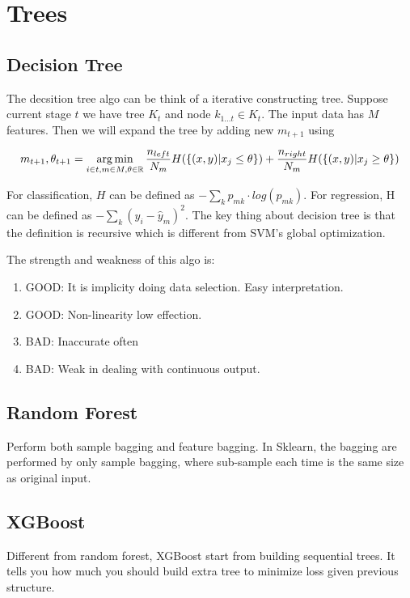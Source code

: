 \section{Trees}
\subsection{Decision Tree}

The decsition tree algo can be think of a iterative constructing tree. Suppose current stage $t$ we have tree $K_t$ and node $k_{1 ... t} \in K_t$. The input data has $M$ features.
Then we will expand the tree by adding new $m_{t+1}$ using

\begin{equation}
  \begin{aligned}
    m_{t+1}, \theta_{t+1} = \operatorname*{arg\,min}_{i \in t, m \in M, \theta \in \mathbb{R}} \frac{n_{left}}{N_m} H(\{(x, y)| x_j \leq \theta\}) + \frac{n_{right}}{N_m} H(\{(x, y)| x_j \geq \theta\})
  \end{aligned}
\end{equation}

For classification, $H$ can be defined as $ -\sum_k p_{mk} \cdot log(p_{mk}) $. For regression, H can be defined as $ -\sum_k (y_i - \hat{y}_m)^2$. The key thing about decision tree is that the {\color{blue}definition is recursive which is different from SVM's global optimization.}

The strength and weakness of this algo is:

\begin{enumerate}
  \item {\color{green}GOOD}: It is implicity doing data selection. Easy interpretation.
  \item {\color{green}GOOD}: Non-linearity low effection.
  \item {\color{red}BAD}: Inaccurate often
  \item {\color{red}BAD}: Weak in dealing with continuous output.
\end{enumerate}


\subsection{Random Forest}
Perform both sample bagging and feature bagging. In Sklearn, the bagging are performed by only sample bagging, where sub-sample each time is the same size as original input.


\subsection{XGBoost}
Different from random forest, XGBoost start from building sequential trees. It tells you how much you should build extra tree to minimize loss given previous structure.

